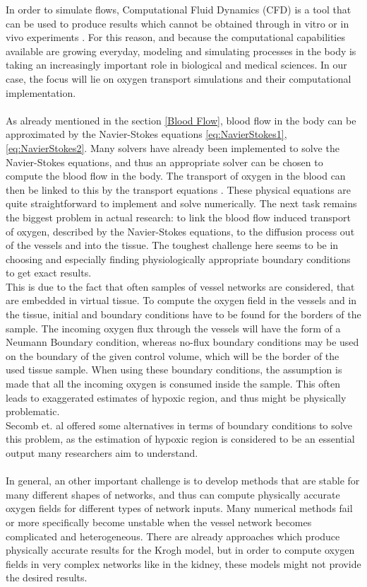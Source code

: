 In order to simulate flows, Computational Fluid Dynamics (CFD) is a tool that can be used to produce results which cannot be obtained through in vitro or in vivo experiments  \cite{mathmodeling}. For this reason, and because the computational capabilities available are growing everyday, modeling and simulating processes in the body is taking an increasingly important role in biological and medical sciences. In our case, the focus will lie on oxygen transport simulations and their computational implementation.\\
\\As already mentioned in the section \ref{Blood Flow}, blood flow in the body can be approximated by the Navier-Stokes equations \ref{eq:NavierStokes1}, \ref{eq:NavierStokes2}. Many solvers have already been implemented to solve the Navier-Stokes equations, and thus an appropriate solver can be chosen to compute the blood flow in the body. The transport of oxygen in the blood can then be linked to this by the transport equations \cite{kuzmin2010guide}. These physical equations are quite straightforward to implement and solve numerically. The next task remains the biggest problem in actual research: to link the blood flow induced transport of oxygen, described by the Navier-Stokes equations, to the diffusion process out of the vessels and into the tissue. The toughest challenge here seems to be in choosing and especially finding physiologically appropriate boundary conditions to get exact results.
\\This is due to the fact that often samples of vessel networks are considered, that are embedded in virtual tissue. To compute the oxygen field in the vessels and in the tissue, initial and boundary conditions have to be found for the borders of the sample. The incoming oxygen flux through the vessels will have the form of a Neumann Boundary condition, whereas no-flux boundary conditions may be used on the boundary of the given control volume, which will be the border of the used tissue sample. When using these boundary conditions, the assumption is made that all the incoming oxygen is consumed inside the sample. This often leads to exaggerated estimates of hypoxic region, and thus might be physically problematic.
\\Secomb et. al \cite{Secomb2004} offered some alternatives in terms of boundary conditions to solve this problem, as the estimation of hypoxic region is considered to be an essential output many researchers aim to understand.\\
\\In general, an other important challenge is to develop methods that are stable for many different shapes of networks, and thus can compute physically accurate oxygen fields for different types of network inputs. Many numerical methods fail or more specifically become unstable when the vessel network becomes complicated and heterogeneous. There are already approaches which produce physically accurate results for the Krogh model, but in order to compute oxygen fields in very complex networks like in the kidney, these models might not provide the desired results.\\\\
